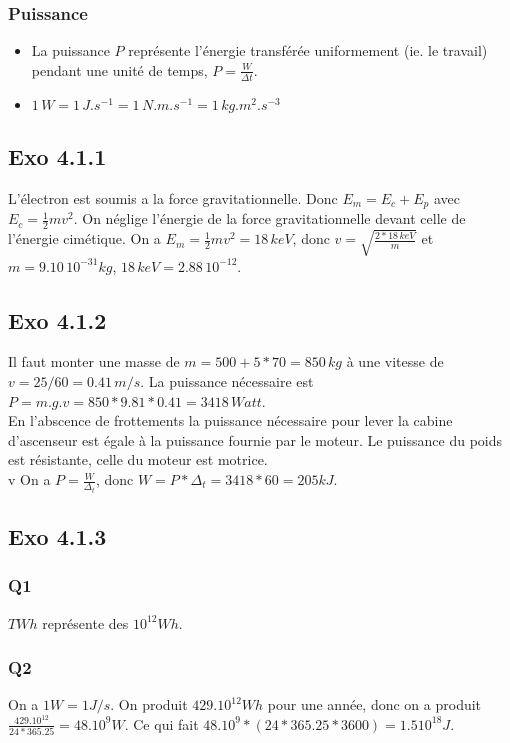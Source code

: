 \documentclass[]{book}
\theoremstyle{definition}
\begin{document}
\subsubsection*{Puissance}
\begin{itemize}
\item La puissance $P$ repr\'esente l'\'energie transf\'er\'ee uniformement (ie. le travail) pendant une unit\'e de temps, $P =\frac{W}{\Delta t}$.
\item $1\,W = 1\,J.s^{-1} = 1\, N.m.s^{-1} = 1\, kg.m^{2}.s^{-3}$
\end{itemize}


\subsection*{Exo 4.1.1}
L'\'electron est soumis a la force gravitationnelle. Donc $E_m = E_c + E_p$ avec $E_c = \frac{1}{2}mv^2$. On n\'eglige l'\'energie de la force gravitationnelle devant celle de l'\'energie cim\'etique. On a $E_m = \frac{1}{2}mv^2 = 18\,keV$, donc $v = \sqrt{\frac{2*18\,keV}{m}}$ et $m=9.10\,10^{-31}kg$, $18\,keV = 2.88\,10^{-12}$. 


\subsection*{Exo 4.1.2}
Il faut monter une masse de $m=500+5*70 = 850\,kg$ \`a une vitesse de $v=25/60 = 0.41\,m/s$. La puissance n\'ecessaire est $P=m.g.v = 850*9.81*0.41 = 3418\,Watt$.\\
 
En l'abscence de frottements la puissance n\'ecessaire pour lever la cabine d'ascenseur est \'egale \`a la puissance fournie par le moteur. Le puissance du poids est r\'esistante, celle du moteur est motrice.\\
v
On a $P =\frac{W}{\Delta_t}$, donc $W = P*\Delta_t = 3418*60 = 205kJ$.

\subsection*{Exo 4.1.3}
\subsubsection{Q1}
$TWh$ repr\'esente des $10^{12}Wh$.

\subsubsection{Q2}
On a $1W = 1J/s$. On produit $429.10^{12}Wh$ pour une ann\'ee, donc on a produit $\frac{429.10^{12}}{24*365.25} = 48.10^{9} W$. Ce qui fait $48.10^{9}*(24*365.25*3600) = 1.510^{18}J$.
\end{document}
